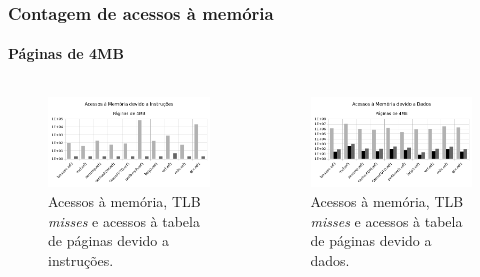 \documentclass[10pt]{beamer}
\begin{document}
\begin{frame}
\frametitle{Contagem de acessos à memória}
\framesubtitle{Páginas de 4MB}

\begin{columns}

\begin{figure}[h!]
\centering
\centering

\includegraphics[width=0.9\linewidth]{inst_4MBs}
\caption{Acessos à memória, TLB \textit{misses} e acessos à tabela de páginas
devido a instruções.}
\end{figure}

\begin{figure}[h!]
\centering
\centering

\includegraphics[width=0.9\linewidth]{data_4MBs}
\caption{Acessos à memória, TLB \textit{misses} e acessos à tabela de páginas
devido a dados.}
\end{figure}
\end{columns}

\end{frame}
\end{document}
